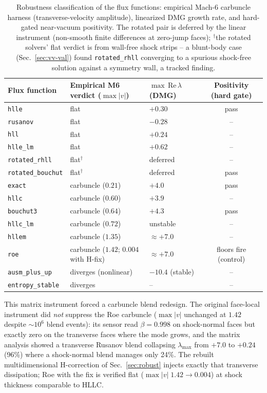 \documentclass[journal,biblatex]{new-aiaa}
\begin{document}
\begin{table}[H]
\centering\footnotesize\setlength{\tabcolsep}{5pt}
\caption{Robustness classification of the flux functions: empirical Mach-6
carbuncle harness (transverse-velocity amplitude), linearized DMG growth rate,
and hard-gated near-vacuum positivity. The rotated pair is deferred by the
linear instrument (non-smooth finite differences at zero-jump faces);
$^\dagger$the rotated solvers' flat verdict is from wall-free shock strips --
a blunt-body case (Sec.~\ref{sec:vv-val}) found \texttt{rotated\_rhll}
converging to a spurious shock-free solution against a symmetry wall, a
tracked finding.}
\label{tab:robustness}
\begin{tabular}{@{}lllc@{}}
\toprule
Flux function & Empirical M6 verdict ($\max|v|$) & $\max\,\mathrm{Re}\,\lambda$ (DMG) & Positivity (hard gate) \\
\midrule
\texttt{hlle} & flat & $+0.30$ & pass \\
\texttt{rusanov} & flat & $-0.28$ & -- \\
\texttt{hll} & flat & $+0.24$ & -- \\
\texttt{hlle\_lm} & flat & $+0.62$ & -- \\
\texttt{rotated\_rhll} & flat$^\dagger$ & deferred & -- \\
\texttt{rotated\_bouchut} & flat$^\dagger$ & deferred & pass \\
\texttt{exact} & carbuncle ($0.21$) & $+4.0$ & pass \\
\texttt{hllc} & carbuncle ($0.60$) & $+3.9$ & -- \\
\texttt{bouchut3} & carbuncle ($0.64$) & $+4.3$ & pass \\
\texttt{hllc\_lm} & carbuncle ($0.72$) & unstable & -- \\
\texttt{hllem} & carbuncle ($1.35$) & $\approx+7.0$ & -- \\
\texttt{roe} & carbuncle ($1.42$; $0.004$ with H-fix) & $\approx+7.0$ & floors fire (control) \\
\texttt{ausm\_plus\_up} & diverges (nonlinear) & $-10.4$ (stable) & -- \\
\texttt{entropy\_stable} & diverges & -- & -- \\
\bottomrule
\end{tabular}
\end{table}

This matrix instrument forced a carbuncle blend redesign. The original face-local instrument did \emph{not} suppress the Roe carbuncle ($\max|v|$ unchanged at $1.42$ despite $\sim10^6$ blend events): its sensor read $\beta=0.998$ on shock-normal faces but exactly zero on the transverse faces where the mode grows, and the matrix analysis showed a transverse Rusanov blend collapsing $\lambda_{\max}$ from $+7.0$ to $+0.24$ (96\%) where a shock-normal blend manages only 24\%. The rebuilt multidimensional H-correction of Sec.~\ref{sec:robust} injects exactly that transverse dissipation; Roe with the fix is verified flat ($\max|v|\;1.42\to0.004$) at shock thickness comparable to HLLC.
\end{document}
